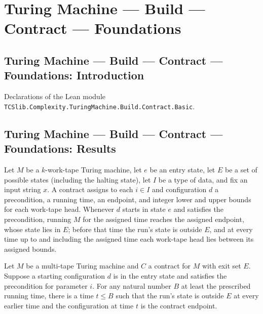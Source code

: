 \section{Turing Machine --- Build --- Contract --- Foundations}
\subsection*{Turing Machine --- Build --- Contract --- Foundations: Introduction}

Declarations of the Lean module \texttt{TCSlib.Complexity.TuringMachine.Build.Contract.Basic}.

\subsection*{Turing Machine --- Build --- Contract --- Foundations: Results}

\begin{definition}
\label{Turing.Contract}
\leanok
{}
Let $M$ be a $k$-work-tape Turing machine, let $e$ be an entry state, let $E$ be a set
of possible states (including the halting state), let $I$ be a type of data, and fix an
input string $x$. A contract assigns to each $i\in I$ and configuration $d$ a
precondition, a running time, an endpoint, and integer lower and upper bounds for each
work-tape head. Whenever $d$ starts in state $e$ and satisfies the precondition, running
$M$ for the assigned time reaches the assigned endpoint, whose state lies in $E$; before
that time the run's state is outside $E$, and at every time up to and including the
assigned time each work-tape head lies between its assigned bounds.
\end{definition}

\begin{theorem}
\label{Turing.Contract.within}
\leanok
{}
Let $M$ be a multi-tape Turing machine and $C$ a contract for $M$ with exit set $E$.
Suppose a starting configuration $d$ is in the entry state and satisfies the
precondition for parameter $i$. For any natural number $B$ at least the prescribed
running time, there is a time $t\leq B$ such that the run's state is outside $E$ at
every earlier time and the configuration at time $t$ is the contract endpoint.
\end{theorem}

